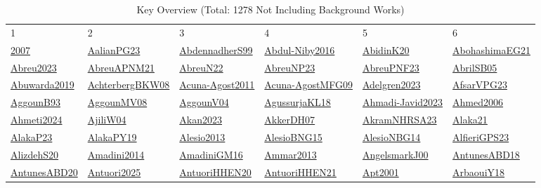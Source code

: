 \begin{longtable}{*{6}{l}}
\rowcolor{white}\caption{Key Overview (Total: 1278 Not Including Background Works)}\\ \toprule
\rowcolor{white}1 & 2 & 3 & 4 & 5 & 6\\ \midrule
\endhead
\bottomrule
\endfoot
\hyperref[detail:2007]{2007} & \hyperref[detail:AalianPG23]{AalianPG23} & \hyperref[detail:AbdennadherS99]{AbdennadherS99} & \hyperref[detail:Abdul-Niby2016]{Abdul-Niby2016} & \hyperref[detail:AbidinK20]{AbidinK20} & \hyperref[detail:AbohashimaEG21]{AbohashimaEG21}\\ 
\hyperref[detail:Abreu2023]{Abreu2023} & \hyperref[detail:AbreuAPNM21]{AbreuAPNM21} & \hyperref[detail:AbreuN22]{AbreuN22} & \hyperref[detail:AbreuNP23]{AbreuNP23} & \hyperref[detail:AbreuPNF23]{AbreuPNF23} & \hyperref[detail:AbrilSB05]{AbrilSB05}\\ 
\hyperref[detail:Abuwarda2019]{Abuwarda2019} & \hyperref[detail:AchterbergBKW08]{AchterbergBKW08} & \hyperref[detail:Acuna-Agost2011]{Acuna-Agost2011} & \hyperref[detail:Acuna-AgostMFG09]{Acuna-AgostMFG09} & \hyperref[detail:Adelgren2023]{Adelgren2023} & \hyperref[detail:AfsarVPG23]{AfsarVPG23}\\ 
\hyperref[detail:AggounB93]{AggounB93} & \hyperref[detail:AggounMV08]{AggounMV08} & \hyperref[detail:AggounV04]{AggounV04} & \hyperref[detail:AgussurjaKL18]{AgussurjaKL18} & \hyperref[detail:Ahmadi-Javid2023]{Ahmadi-Javid2023} & \hyperref[detail:Ahmed2006]{Ahmed2006}\\ 
\hyperref[detail:Ahmeti2024]{Ahmeti2024} & \hyperref[detail:AjiliW04]{AjiliW04} & \hyperref[detail:Akan2023]{Akan2023} & \hyperref[detail:AkkerDH07]{AkkerDH07} & \hyperref[detail:AkramNHRSA23]{AkramNHRSA23} & \hyperref[detail:Alaka21]{Alaka21}\\ 
\hyperref[detail:AlakaP23]{AlakaP23} & \hyperref[detail:AlakaPY19]{AlakaPY19} & \hyperref[detail:Alesio2013]{Alesio2013} & \hyperref[detail:AlesioBNG15]{AlesioBNG15} & \hyperref[detail:AlesioNBG14]{AlesioNBG14} & \hyperref[detail:AlfieriGPS23]{AlfieriGPS23}\\ 
\hyperref[detail:AlizdehS20]{AlizdehS20} & \hyperref[detail:Amadini2014]{Amadini2014} & \hyperref[detail:AmadiniGM16]{AmadiniGM16} & \hyperref[detail:Ammar2013]{Ammar2013} & \hyperref[detail:AngelsmarkJ00]{AngelsmarkJ00} & \hyperref[detail:AntunesABD18]{AntunesABD18}\\ 
\hyperref[detail:AntunesABD20]{AntunesABD20} & \hyperref[detail:Antuori2025]{Antuori2025} & \hyperref[detail:AntuoriHHEN20]{AntuoriHHEN20} & \hyperref[detail:AntuoriHHEN21]{AntuoriHHEN21} & \hyperref[detail:Apt2001]{Apt2001} & \hyperref[detail:ArbaouiY18]{ArbaouiY18}\\ 

\end{longtable}
